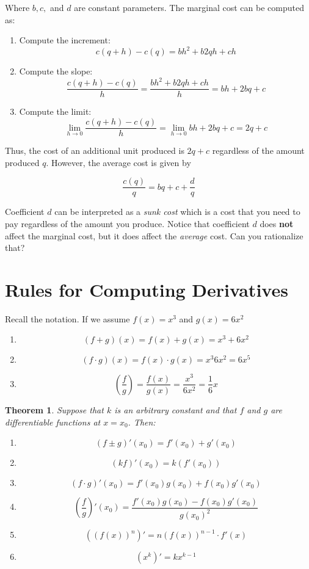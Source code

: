 \documentclass[a4paper,11pt]{article}
\theoremstyle{definition}
\theoremstyle{plain}
\newtheorem{theorem}{Theorem}
\begin{document}
Where \(b, c,\) and \(d\) are constant parameters. The marginal cost can
be computed as:

\begin{enumerate}
\def\labelenumi{\arabic{enumi}.}
\item
  Compute the increment: \[
  c(q+h)-c(q) = bh^2 + b2qh + ch
  \]
\item
  Compute the slope: \[
  \frac{c(q+h)-c(q)}{h} = \frac{bh^2 + b2qh + ch}{h} = bh + 2bq + c
  \]
\item
  Compute the limit: \[
  \lim_{h\rightarrow 0}{\frac{c(q+h)-c(q)}{h}} = \lim_{h\rightarrow 0}{bh + 2bq + c} = 2q + c
  \]
\end{enumerate}

Thus, the cost of an additional unit produced is \(2q + c\) regardless
of the amount produced \(q\). However, the average cost is given by

\[
\frac{c(q)}{q} = bq + c + \frac{d}{q}
\]

Coefficient \(d\) can be interpreted as a \emph{sunk cost} which is a
cost that you need to pay regardless of the amount you produce. Notice
that coefficient \(d\) does \textbf{not} affect the marginal cost, but
it does affect the \emph{average} cost. Can you rationalize that?

\section{Rules for Computing
Derivatives}\label{rules-for-computing-derivatives}

Recall the notation. If we assume \(f(x) = x^3\) and \(g(x) = 6x^2\)

\begin{enumerate}
\def\labelenumi{\arabic{enumi}.}
\item
  \[(f + g)(x) = f(x) + g(x) = x^3 + 6x^2\]
\item
  \[(f\cdot g)(x) = f(x)\cdot g(x) = x^3 6x^2 = 6x^5\]
\item
  \[\left(\frac{f}{g}\right) = \frac{f(x)}{g(x)} = \frac{x^3}{6x^2} = \frac{1}{6}x\]
\end{enumerate}

\begin{theorem}\label{thm:deri_rules}
Suppose that \(k\) is an arbitrary constant and that
\(f\) and \(g\) are differentiable functions at \(x = x_0\). Then:

\begin{enumerate}
\def\labelenumi{\arabic{enumi}.}
\item
  \[(f\pm g)'(x_0) = f'(x_0) + g'(x_0)\]
\item
  \[(kf)'(x_0) = k\left(f'(x_0)\right)\]
\item
  \[(f\cdot g)'(x_0) = f'(x_0)g(x_0) + f(x_0)g'(x_0)\]
\item
  \[\left(\frac{f}{g}\right)'(x_0) = \frac{f'(x_0)g(x_0) - f(x_0)g'(x_0)}{g(x_0)^2}\]
\item
  \[\left(\left(f(x)\right)^n\right)' = n\left(f(x)\right)^{n-1}\cdot f'(x)\]
\item
  \[\left(x^k\right)' = kx^{k-1}\]
\end{enumerate}
\end{theorem}
\end{document}
